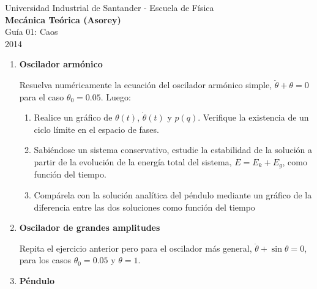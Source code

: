 \documentclass[a4paper,12pt]{article}
\begin{document}
\begin{center}
  {\small{Universidad Industrial de Santander - Escuela de Física}}\\
  {\bf{Mecánica Teórica (Asorey)}}\\
  \vspace{0.4cm}
  Guía 01: Caos\\ 2014
\end{center}
\renewcommand{\labelenumi}{\arabic{enumi})}
\renewcommand{\labelenumii}{\arabic{enumii})}

\begin{enumerate}
  \item {\bf{Oscilador armónico}}

    Resuelva numéricamente la ecuación del oscilador armónico simple, $\ddot
    \theta + \theta = 0$ para el caso $\theta_0=0.05$. Luego: 
    \begin{enumerate}
      \item Realice un gráfico de $\theta(t)$, $\dot \theta(t)$ y $p(q)$.
        Verifique la existencia de un ciclo límite en el espacio de fases. 
      \item Sabiéndose un sistema conservativo, estudie la estabilidad de la
        solución a partir de la evolución de la energía total del sistema,
        $E=E_k+E_g$, como función del tiempo.
      \item Compárela con la solución analítica del péndulo mediante un gráfico
        de la diferencia entre las dos soluciones como función del tiempo 
    \end{enumerate}

  \item {\bf{Oscilador de grandes amplitudes}}

    Repita el ejercicio anterior pero para el oscilador más general, $\ddot
    \theta + \sin \theta = 0$, para los casos $\theta_0=0.05$ y $\theta=1$.

  \item {\bf{Péndulo}}


\end{enumerate}
\end{document}
